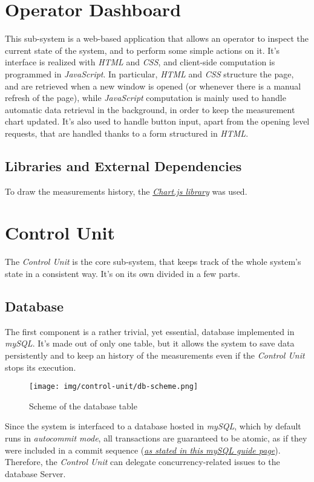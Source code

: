 \documentclass[a4paper,12pt]{report}
\begin{document}
	\section{Operator Dashboard}
	This sub-system is a web-based application that allows an operator to inspect the current state of the system, and to perform some simple actions on it. It's interface is realized with \textit{HTML} and \textit{CSS}, and client-side computation is programmed in \textit{JavaScript}.
	\newline In particular, \textit{HTML} and \textit{CSS} structure the page, and are retrieved when a new window is opened (or whenever there is a manual refresh of the page), while \textit{JavaScript} computation is mainly used to handle automatic data retrieval in the background, in order to keep the measurement chart updated. It's also used to handle button input, apart from the opening level requests, that are handled thanks to a form structured in \textit{HTML}.
	\subsection{Libraries and External Dependencies}
	To draw the measurements history, the \href{https://www.chartjs.org/}{\textit{Chart.js library}} was used.
	\section{Control Unit}
	The \textit{Control Unit} is the core sub-system, that keeps track of the whole system's state in a consistent way. It's on its own divided in a few parts.
		\subsection{Database}
		The first component is a rather trivial, yet essential, database implemented in \textit{mySQL}. It's made out of only one table, but it allows the system to save data persistently and to keep an history of the measurements even if the \textit{Control Unit} stops its execution.
		\begin{figure}[H]
			\centering{}
			\texttt{[image: img/control-unit/db-scheme.png]}
			\caption{Scheme of the database table}
			\label{img:control-unit/db-scheme}
		\end{figure}
		Since the system is interfaced to a database hosted in \textit{mySQL}, which by default runs in \textit{autocommit mode}, all transactions are guaranteed to be atomic, as if they were included in a commit sequence (\href{https://dev.mysql.com/doc/refman/8.4/en/commit.html}{\textit{as stated in this mySQL guide page}}). Therefore, the \textit{Control Unit} can delegate concurrency-related issues to the database Server.
\end{document}
